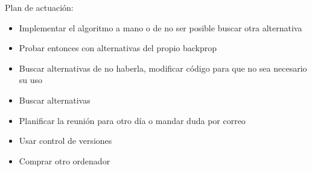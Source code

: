 Plan de actuación:
\begin{itemize}
    \item Implementar el algoritmo a mano o de no ser posible buscar otra alternativa
    \item Probar entonces con alternativas del propio backprop
    \item Buscar alternativas de no haberla, modificar código para que no sea necesario su uso
    \item Buscar alternativas
    \item Planificar la reunión para otro día o mandar duda por correo
    \item Usar control de versiones
    \item Comprar otro ordenador
\end{itemize}


